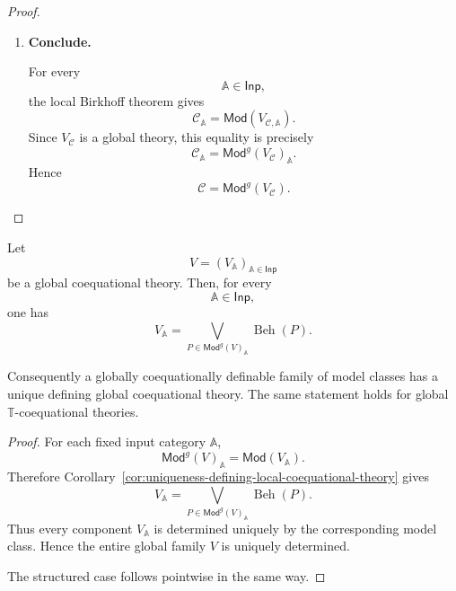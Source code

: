 \begin{proof}
\begin{enumerate}
        Suppose now that \(\mathbb B\) is \(\mathbb T\)-structured and that
        every \(\mathcal C_{\mathbb A}\) is also closed under the operations
        induced by \(\mathbb T\).

        By Theorem~\ref{thm:T-coequational-birkhoff}, applied separately to
        every input category \(\mathbb A\), each
        \[
            V_{\mathcal C,\mathbb A}
        \]
        is a local \(\mathbb T\)-coequational theory. The preceding argument
        has already shown that these local theories satisfy the global
        reindexing condition. Therefore
        \[
            V_{\mathcal C}
        \]
        is a global \(\mathbb T\)-coequational theory.

        \item \textbf{Conclude.}

        For every
        \[
            \mathbb A\in\mathsf{Inp},
        \]
        the local Birkhoff theorem gives
        \[
            \mathcal C_{\mathbb A}
            =
            \mathsf{Mod}(V_{\mathcal C,\mathbb A}).
        \]
        Since \(V_{\mathcal C}\) is a global theory, this equality is precisely
        \[
            \mathcal C_{\mathbb A}
            =
            \mathsf{Mod}^{g}(V_{\mathcal C})_{\mathbb A}.
        \]
        Hence
        \[
            \mathcal C
            =
            \mathsf{Mod}^{g}(V_{\mathcal C}).
        \]
    \end{enumerate}
\end{proof}

\begin{corollary}
\label{cor:uniqueness-defining-global-coequational-theory}
    Let
    \[
        V=(V_{\mathbb A})_{\mathbb A\in\mathsf{Inp}}
    \]
    be a global coequational theory. Then, for every
    \[
        \mathbb A\in\mathsf{Inp},
    \]
    one has
    \[
        V_{\mathbb A}
        =
        \bigvee_{
            P\in\mathsf{Mod}^{g}(V)_{\mathbb A}
        }
        \operatorname{Beh}(P).
    \]

    Consequently a globally coequationally definable family of model classes
    has a unique defining global coequational theory. The same statement holds
    for global \(\mathbb T\)-coequational theories.
\end{corollary}

\begin{proof}
    For each fixed input category \(\mathbb A\),
    \[
        \mathsf{Mod}^{g}(V)_{\mathbb A}
        =
        \mathsf{Mod}(V_{\mathbb A}).
    \]
    Therefore
    Corollary~\ref{cor:uniqueness-defining-local-coequational-theory} gives
    \[
        V_{\mathbb A}
        =
        \bigvee_{
            P\in\mathsf{Mod}^{g}(V)_{\mathbb A}
        }
        \operatorname{Beh}(P).
    \]
    Thus every component \(V_{\mathbb A}\) is determined uniquely by the
    corresponding model class. Hence the entire global family \(V\) is
    uniquely determined.

    The structured case follows pointwise in the same way.
\end{proof}

